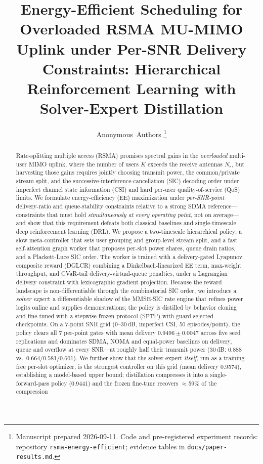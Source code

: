 \documentclass[journal]{IEEEtran}
\title{Energy-Efficient Scheduling for Overloaded RSMA MU-MIMO Uplink under
Per-SNR Delivery Constraints: Hierarchical Reinforcement Learning with
Solver-Expert Distillation}
\author{Anonymous~Authors%
\thanks{Manuscript prepared 2026-09-11. Code and pre-registered experiment
records: repository \texttt{rsma-energy-efficient}; evidence tables in
\texttt{docs/paper-results.md}.}%
}
\begin{document}
\maketitle

\begin{abstract}
Rate-splitting multiple access (RSMA) promises spectral gains in the
\emph{overloaded} multi-user MIMO uplink, where the number of users $K$ exceeds
the receive antennas $N_r$, but harvesting those gains requires jointly choosing
transmit power, the common/private stream split, and the
successive-interference-cancellation (SIC) decoding order under imperfect channel
state information (CSI) and hard per-user quality-of-service (QoS) limits. We
formulate energy-efficiency (EE) maximization under \emph{per-SNR-point}
delivery-ratio and queue-stability constraints relative to a strong SDMA
reference---constraints that must hold \emph{simultaneously at every operating
point}, not on average---and show that this requirement defeats both classical
baselines and single-timescale deep reinforcement learning (DRL). We propose a
two-timescale hierarchical policy: a slow meta-controller that sets user grouping
and group-level stream split, and a fast self-attention graph worker that proposes
per-slot power shares, queue drain ratios, and a Plackett-Luce SIC order. The
worker is trained with a delivery-gated Lyapunov composite reward (DGLCR)
combining a Dinkelbach-linearized EE term, max-weight throughput, and CVaR-tail
delivery-virtual-queue penalties, under a Lagrangian delivery constraint with
lexicographic gradient projection. Because the reward landscape is
non-differentiable through the combinatorial SIC order, we introduce a
\emph{solver expert}: a differentiable shadow of the MMSE-SIC rate engine that
refines power logits online and supplies demonstrations; the policy is distilled
by behavior cloning and fine-tuned with a stepwise-frozen protocol (SFTP) with
guard-selected checkpoints. On a 7-point SNR grid (0--30\,dB, imperfect CSI, 50
episodes/point), the policy clears all 7 per-point gates with mean delivery
$0.9496 \pm 0.0047$ across five seed replications and dominates SDMA, NOMA and
equal-power baselines on delivery, queue and overflow at every SNR---at roughly
half their transmit power (30\,dB: 0.888 vs.\ 0.664/0.581/0.601). We further show
that the solver expert \emph{itself}, run as a training-free per-slot optimizer, is
the strongest controller on this grid (mean delivery 0.9574), establishing a
model-based upper bound; distillation compresses it into a single-forward-pass
policy (0.9441) and the frozen fine-tune recovers $\approx$59\% of the compression

\end{abstract}
\end{document}
